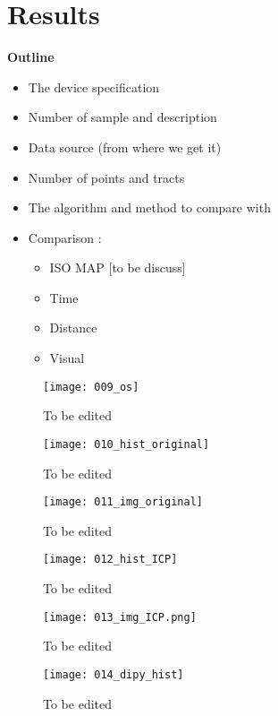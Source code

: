 \documentclass[../structure.tex]{subfiles}
\begin{document}
\chapter{Results}

\textbf{Outline}
\begin{itemize}
\item The device specification
\item Number of sample and description
\item Data source (from where we get it)
\item Number of points and tracts
\item The algorithm and method to compare with
\item Comparison :
\begin{itemize}
\item ISO MAP [to be discuss]
\item Time
\item Distance 
\item Visual
\end{itemize}
\end{itemize}

\begin{figure}[h!]
\centering
\texttt{[image: 009\_os]}
\captionsetup{justification=centering}
\caption{To be edited}
\end{figure}

\begin{figure}[h!]
\centering
\texttt{[image: 010\_hist\_original]}
\captionsetup{justification=centering}
\caption{To be edited}
\end{figure}


\begin{figure}[h!]
\centering
\texttt{[image: 011\_img\_original]}
\captionsetup{justification=centering}
\caption{To be edited}
\end{figure}

\begin{figure}[h!]
\centering
\texttt{[image: 012\_hist\_ICP]}
\captionsetup{justification=centering}
\caption{To be edited}
\end{figure}

\begin{figure}[h!]
\centering
\texttt{[image: 013\_img\_ICP.png]}
\captionsetup{justification=centering}
\caption{To be edited}
\end{figure}

\begin{figure}[h!]
\centering
\texttt{[image: 014\_dipy\_hist]}
\captionsetup{justification=centering}
\caption{To be edited}
\end{figure}
\end{document}
